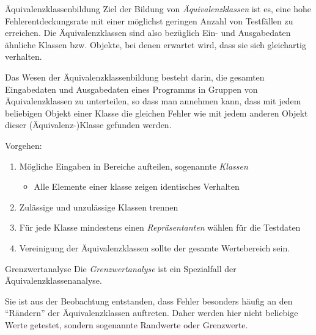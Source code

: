 \begin{defi}{Äquivalenzklassenbildung}
    Ziel der Bildung von \emph{Äquivalenzklassen} ist es, eine hohe Fehlerentdeckungsrate mit einer möglichst geringen Anzahl von Testfällen zu erreichen. Die Äquivalenzklassen sind also bezüglich Ein- und Ausgabedaten ähnliche Klassen bzw. Objekte, bei denen erwartet wird, dass sie sich gleichartig verhalten.

    Das Wesen der Äquivalenzklassenbildung besteht darin, die gesamten Eingabedaten und Ausgabedaten eines Programms in Gruppen von Äquivalenzklassen zu unterteilen, so dass man annehmen kann, dass mit jedem beliebigen Objekt einer Klasse die gleichen Fehler wie mit jedem anderen Objekt dieser (Äquivalenz-)Klasse gefunden werden.

    Vorgehen:
    \begin{enumerate}
        \item Mögliche Eingaben in Bereiche aufteilen, sogenannte \emph{Klassen}
              \begin{itemize}
                  \item Alle Elemente einer klasse zeigen identisches Verhalten
              \end{itemize}
        \item Zulässige und unzulässige Klassen trennen
        \item Für jede Klasse mindestens einen \emph{Repräsentanten} wählen für die Testdaten
        \item Vereinigung der Äquivalenzklassen sollte der gesamte Wertebereich sein.
    \end{enumerate}
\end{defi}

\begin{defi}{Grenzwertanalyse}
    Die \emph{Grenzwertanalyse} ist ein Spezialfall der Äquivalenzklassenanalyse.

    Sie ist aus der Beobachtung entstanden, dass Fehler besonders häufig an den \enquote{Rändern} der Äquivalenzklassen auftreten.
    Daher werden hier nicht beliebige Werte getestet, sondern sogenannte Randwerte oder Grenzwerte.
\end{defi}